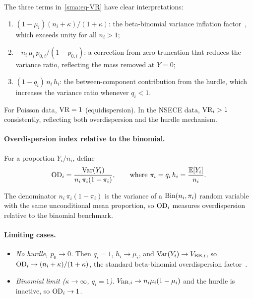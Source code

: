 \begin{remark}\label{sma:rem-VR-interpretation}
The three terms in~\eqref{sma:eq-VR} have clear interpretations:
\begin{enumerate}[label=\textup{(\roman*)}]
  \item $(1-\mu_i)(n_i+\kappa)/(1+\kappa)$: the beta-binomial variance
    inflation factor~\citep{Prentice1986}, which exceeds unity for all $n_i > 1$;
  \item $-n_i\,\mu_i\,p_{0,i}/(1-p_{0,i})$: a correction from
    zero-truncation that reduces the variance ratio, reflecting the
    mass removed at $Y = 0$;
  \item $(1-q_i)\,n_i\,h_i$: the between-component contribution from the
    hurdle, which increases the variance ratio whenever $q_i < 1$.
\end{enumerate}
For Poisson data, $\textup{VR} = 1$ (equidispersion). In the NSECE data,
$\textup{VR}_i > 1$ consistently, reflecting both overdispersion and the
hurdle mechanism.
\end{remark}


\paragraph{Overdispersion index relative to the binomial.}

\begin{definition}\label{sma:def-OD}
For a proportion $Y_i/n_i$, define
\begin{equation}\label{sma:eq-OD}
  \textup{OD}_i
  = \frac{\operatorname*{Var}(Y_i)}{n_i\,\pi_i(1-\pi_i)},
  \qquad
  \text{where }
  \pi_i = q_i\,h_i = \frac{\mathbb{E}[Y_i]}{n_i}.
\end{equation}
\end{definition}

The denominator $n_i\,\pi_i(1-\pi_i)$ is the variance of a
$\operatorname{Bin}(n_i, \pi_i)$ random variable with the same unconditional mean
proportion, so $\textup{OD}_i$ measures overdispersion relative to the
binomial benchmark.

\paragraph{Limiting cases.}

\begin{itemize}[nosep]
  \item \emph{No hurdle, $p_0 \to 0$.} Then $q_i = 1$, $h_i \to \mu_i$,
    and $\operatorname*{Var}(Y_i) \to V_{\textup{BB},i}$, so
    $\textup{OD}_i \to (n_i+\kappa)/(1+\kappa)$, the standard beta-binomial
    overdispersion factor~\citep{Prentice1986}.
  \item \emph{Binomial limit ($\kappa \to \infty$, $q_i = 1$).}
    $V_{\textup{BB},i} \to n_i\mu_i(1-\mu_i)$ and the hurdle is inactive, so
    $\textup{OD}_i \to 1$.
\end{itemize}

